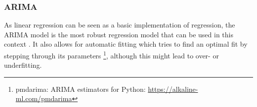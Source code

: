\subsubsection{ARIMA}

As linear regression can be seen as a basic implementation of regression, the ARIMA model is the most robust regression model that can be used in this context \cite{siaminamini2018forecasting, chatfield2019analysis}. It also allows for automatic fitting which tries to find an optimal fit by stepping through its parameters \footnote{pmdarima: ARIMA estimators for Python: \url{https://alkaline-ml.com/pmdarima}}, although this might lead to over- or underfitting.